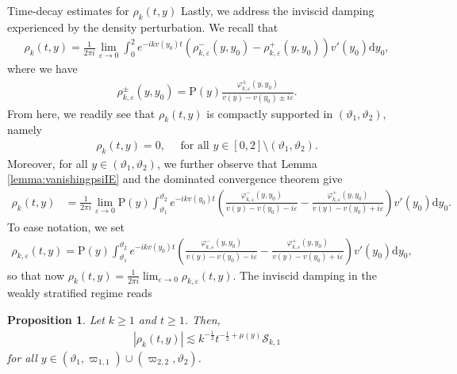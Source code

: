 \documentclass[11pt,reqno]{amsproc}
\makeatletter
\renewcommand\subsection{\@startsection{subsection}{2}%
\normalparindent{.5\linespacing\@plus.7\linespacing}{-.5em}
{\normalfont\bfseries}}
\newtheorem{proposition}{Proposition}[section]
\theoremstyle{definition}
\numberwithin{equation}{section}
\newcommand{\cS}{{\mathcal S}}
\renewcommand{\d}{\mathrm{d}}
\newcommand{\ep}{\varepsilon}
\makeatother
\begin{document}
\subsection{Time-decay estimates for $\rho_k(t,y)$}
Lastly, we address the inviscid damping experienced by the density perturbation. We recall that
\begin{align}\label{eq:rhooscint}
\rho_k(t,y) = \frac{1}{2\pi i}\lim_{\ep\rightarrow 0}\int_0^2 e^{-ikv(y_0)t} \left( \rho_{k,\ep}^-(y,y_0) - \rho_{k,\ep}^+(y,y_0) \right) v'(y_0) \d y_0,
\end{align}
where we have
\begin{align*}
\rho_{k,\ep}^\pm(y,y_0) = \mathrm{P}(y)\frac{\varphi_{k,\ep}^\pm(y,y_0)}{v(y) - v(y_0) \pm i\ep}.
\end{align*}
From here, we readily see that $\rho_k(t,y)$ is compactly supported in $(\vartheta_1,\vartheta_2)$, namely
\begin{align*}
\rho_k(t,y) = 0, \quad \text{ for all }y\in [0,2]\setminus (\vartheta_1,\vartheta_2).
\end{align*}
Moreover, for all $y\in (\vartheta_1,\vartheta_2)$, we further observe that Lemma \ref{lemma:vanishingpsiIE} and the dominated convergence theorem give
\begin{align*}
\rho_k(t,y) &= \frac{1}{2\pi i}\lim_{\ep\rightarrow 0} \mathrm{P}(y)\int_{\vartheta_1}^{\vartheta_2} e^{-ikv(y_0)t} \left( \frac{\varphi_{k,\ep}^-(y,y_0)}{v(y) - v(y_0) - i\ep} - \frac{\varphi_{k,\ep}^+(y,y_0)}{v(y) - v(y_0) + i\ep} \right) v'(y_0) \d y_0.
\end{align*}
To ease notation, we set
\begin{align}\label{eq:defrhokep}
\rho_{k,\ep}(t,y) = \mathrm{P}(y)\int_{\vartheta_1}^{\vartheta_2} e^{-ikv(y_0)t} \left( \frac{\varphi_{k,\ep}^-(y,y_0)}{v(y) - v(y_0) - i\ep} - \frac{\varphi_{k,\ep}^+(y,y_0)}{v(y) - v(y_0) + i\ep} \right) v'(y_0) \d y_0,
\end{align}
so that now $\rho_k(t,y) = \frac{1}{2\pi i}\lim_{\ep\rightarrow 0} \rho_{k,\ep}(t,y)$. The inviscid damping in the weakly stratified regime reads

\begin{proposition}\label{prop:IDrhoweak}
Let $k\geq 1$ and $t\geq 1$. Then,
\begin{align*}
\left| \rho_k(t,y) \right| \lesssim k^{-\frac12}t^{-\frac12+\mu(y)}\cS_{k,1}
\end{align*}
for all $y\in (\vartheta_1,\varpi_{1,1})\cup (\varpi_{2,2}, \vartheta_2)$.
\end{proposition}
\end{document}
